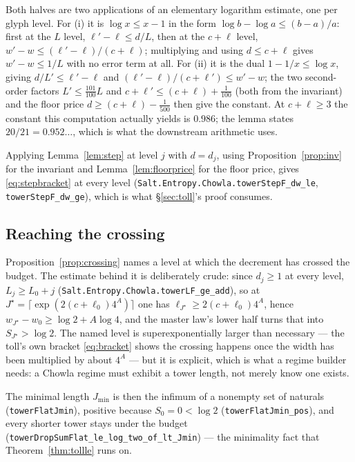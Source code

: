 \documentclass[11pt]{amsart}
\newcommand{\leaninline}[1]{{\small\texttt{#1}}}
\theoremstyle{remark}
\begin{document}
Both halves are two applications of an elementary logarithm estimate, one
per glyph level. For (i) it is $\log x \le x - 1$ in the form
$\log b - \log a \le (b-a)/a$: first at the $L$ level,
$\ell' - \ell \le d/L$, then at the $c+\ell$ level,
$w' - w \le (\ell'-\ell)/(c+\ell)$; multiplying and using
$d \le c + \ell$ gives $w' - w \le 1/L$ with no error term at all. For
(ii) it is the dual $1 - 1/x \le \log x$, giving
$d/L' \le \ell' - \ell$ and
$(\ell'-\ell)/(c+\ell') \le w' - w$; the two second-order factors
$L' \le \frac{101}{100}L$ and $c + \ell' \le (c+\ell) + \frac{1}{100}$
(both from the invariant) and the floor price
$d \ge (c+\ell) - \frac{1}{500}$ then give the constant. At
$c + \ell \ge 3$ the constant this computation actually yields is
$0.986$; the lemma states $20/21 = 0.952\ldots$, which is what the
downstream arithmetic uses.

Applying Lemma~\ref{lem:step} at level $j$ with $d = d_j$, using
Proposition~\ref{prop:inv} for the invariant and
Lemma~\ref{lem:floorprice} for the floor price, gives
\eqref{eq:stepbracket} at every level
(\leaninline{Salt.Entropy.Chowla.towerStepF\_dw\_le},
\leaninline{towerStepF\_dw\_ge}), which is what \S\ref{sec:toll}'s proof
consumes.

\subsection{Reaching the crossing}
Proposition~\ref{prop:crossing} names a level at which the decrement has
crossed the budget. The estimate behind it is deliberately crude: since
$d_j \ge 1$ at every level, $L_j \ge L_0 + j$
(\leaninline{Salt.Entropy.Chowla.towerLF\_ge\_add}), so at
$J^\star = \lceil \exp(2(c+\ell_0)4^{A})\rceil$ one has
$\ell_{J^\star} \ge 2(c+\ell_0)4^{A}$, hence
$w_{J^\star} - w_0 \ge \log 2 + A\log 4$, and the master law's lower half
turns that into $S_{J^\star} > \log 2$. The named level is superexponentially
larger than necessary --- the toll's own bracket \eqref{eq:bracket} shows
the crossing happens once the width has been multiplied by about $4^{A}$ ---
but it is explicit, which is what a regime builder needs: a Chowla regime
must exhibit a tower length, not merely know one exists.

The minimal length $J_{\min}$ is then the infimum of a nonempty set of
naturals (\leaninline{towerFlatJmin}), positive because $S_0 = 0 < \log 2$
(\leaninline{towerFlatJmin\_pos}), and every shorter tower stays under the
budget (\leaninline{towerDropSumFlat\_le\_log\_two\_of\_lt\_Jmin}) --- the
minimality fact that Theorem~\ref{thm:tollle} runs on.
\end{document}
